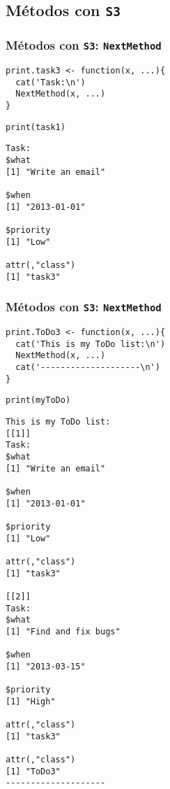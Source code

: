 \documentclass[xcolor={usenames,svgnames,dvipsnames}]{beamer}
\begin{document}
\subsection{Métodos con \texttt{S3}}
\label{sec-2-2}
\begin{frame}[fragile]
\frametitle{Métodos con \texttt{S3}: \texttt{NextMethod}}
\label{sec-2-2-1}


\lstset{language=R}
\begin{lstlisting}
print.task3 <- function(x, ...){
  cat('Task:\n')
  NextMethod(x, ...)
}
\end{lstlisting}



\lstset{language=R}
\begin{lstlisting}
print(task1)
\end{lstlisting}


\begin{verbatim}
Task:
$what
[1] "Write an email"

$when
[1] "2013-01-01"

$priority
[1] "Low"

attr(,"class")
[1] "task3"
\end{verbatim}
\end{frame}
\begin{frame}[fragile]
\frametitle{Métodos con \texttt{S3}: \texttt{NextMethod}}
\label{sec-2-2-2}


\lstset{language=R}
\begin{lstlisting}
print.ToDo3 <- function(x, ...){
  cat('This is my ToDo list:\n')
  NextMethod(x, ...)
  cat('--------------------\n')
}
\end{lstlisting}



\lstset{language=R}
\begin{lstlisting}
print(myToDo)
\end{lstlisting}


\begin{verbatim}
This is my ToDo list:
[[1]]
Task:
$what
[1] "Write an email"

$when
[1] "2013-01-01"

$priority
[1] "Low"

attr(,"class")
[1] "task3"

[[2]]
Task:
$what
[1] "Find and fix bugs"

$when
[1] "2013-03-15"

$priority
[1] "High"

attr(,"class")
[1] "task3"

attr(,"class")
[1] "ToDo3"
--------------------
\end{verbatim}
\end{frame}
\end{document}

